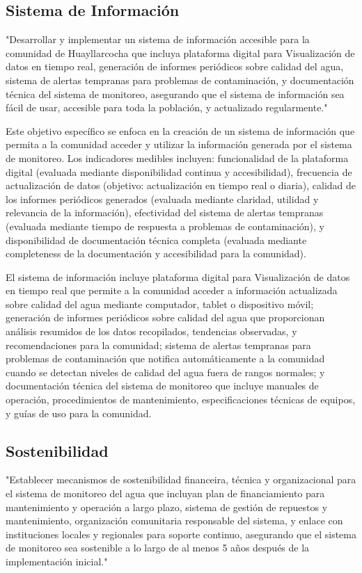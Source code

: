 \subsection{Sistema de Información}

"Desarrollar y implementar un sistema de información accesible para la comunidad de Huayllarcocha que incluya plataforma digital para Visualización de datos en tiempo real, generación de informes periódicos sobre calidad del agua, sistema de alertas tempranas para problemas de contaminación, y documentación técnica del sistema de monitoreo, asegurando que el sistema de información sea fácil de usar, accesible para toda la población, y actualizado regularmente."

Este objetivo específico se enfoca en la creación de un sistema de información que permita a la comunidad acceder y utilizar la información generada por el sistema de monitoreo. Los indicadores medibles incluyen: funcionalidad de la plataforma digital (evaluada mediante disponibilidad continua y accesibilidad), frecuencia de actualización de datos (objetivo: actualización en tiempo real o diaria), calidad de los informes periódicos generados (evaluada mediante claridad, utilidad y relevancia de la información), efectividad del sistema de alertas tempranas (evaluada mediante tiempo de respuesta a problemas de contaminación), y disponibilidad de documentación técnica completa (evaluada mediante completeness de la documentación y accesibilidad para la comunidad).

El sistema de información incluye plataforma digital para Visualización de datos en tiempo real que permite a la comunidad acceder a información actualizada sobre calidad del agua mediante computador, tablet o dispositivo móvil; generación de informes periódicos sobre calidad del agua que proporcionan análisis resumidos de los datos recopilados, tendencias observadas, y recomendaciones para la comunidad; sistema de alertas tempranas para problemas de contaminación que notifica automáticamente a la comunidad cuando se detectan niveles de calidad del agua fuera de rangos normales; y documentación técnica del sistema de monitoreo que incluye manuales de operación, procedimientos de mantenimiento, especificaciones técnicas de equipos, y guías de uso para la comunidad.

\subsection{Sostenibilidad}
"Establecer mecanismos de sostenibilidad financeira, técnica y organizacional para el sistema de monitoreo del agua que incluyan plan de financiamiento para mantenimiento y operación a largo plazo, sistema de gestión de repuestos y mantenimiento, organización comunitaria responsable del sistema, y enlace con instituciones locales y regionales para soporte continuo, asegurando que el sistema de monitoreo sea sostenible a lo largo de al menos 5 años después de la implementación inicial."

